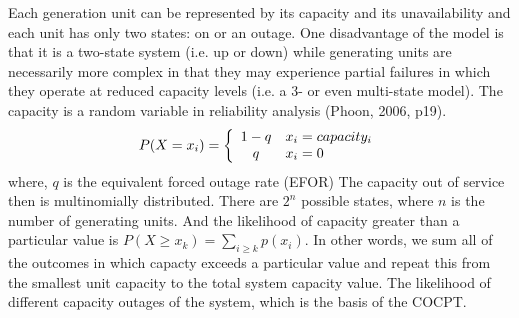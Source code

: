 \documentclass[10pt]{amsart}
\begin{document}
	Each generation unit can be represented by its capacity and its unavailability and each unit has only two states: on or an outage. 
	One disadvantage of the model is that it is a two-state system (i.e. up or down) while generating units are necessarily more complex in that they may experience partial failures in which they operate at reduced capacity levels (i.e. a 3- or even multi-state model).
	The capacity is a random variable in reliability analysis (Phoon, 2006, p19).
	\[
 	   P(X=x_i)=\left\{
             		   \begin{array}{c l}
             			   1-q & x_i = capacity_i \\
             			   q & x_i = 0
            		    \end{array}
         			\right.
	\]
	where, $q$ is the equivalent forced outage rate (EFOR)
	The capacity out of service then is multinomially distributed. 
	There are $2^n$ possible states, where $n$ is the number of generating units.
	And the likelihood of capacity greater than a particular value is $P(X \geq x_k) = \sum_{i \geq k} p(x_i)$.
	In other words, we sum all of the outcomes in which capacty exceeds a particular value and repeat this from the smallest unit capacity to the total system capacity value.  
	The likelihood of different capacity outages of the system, which is the basis of the COCPT. 			
	




\printbibliography
\end{document}
